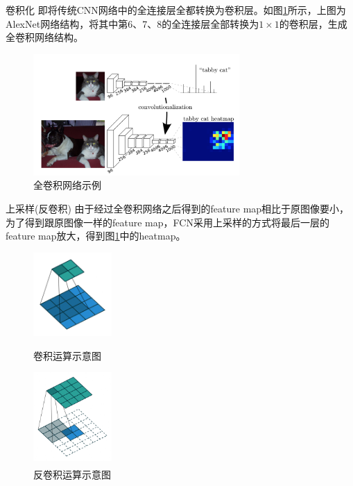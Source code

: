 \documentclass{beamer}
\newcommand{\upcite}[1]{\textsuperscript{\textsuperscript{\cite{#1}}}}
\begin{document}
\begin{frame}{卷积化}
\qquad 即将传统CNN网络中的全连接层全都转换为卷积层。如图\ref{fcn}所示，上图为AlexNet网络结构，将其中第6、7、8的全连接层全部转换为$1\times1$的卷积层，生成全卷积网络结构。
\begin{figure}
	\centering
	\includegraphics[width=0.7\textwidth]{images/fcn.png}
	\caption{\label{fcn}全卷积网络示例}
\end{figure}
\end{frame}
\begin{frame}{上采样(反卷积)}
由于经过全卷积网络之后得到的feature map相比于原图像要小，为了得到跟原图像一样的feature map，FCN采用上采样的方式将最后一层的feature map放大，得到图\ref{fcn}中的heatmap。

\begin{figure}
	\centering
	\begin{minipage}[t]{0.45\textwidth}
		\centering
		\includegraphics[width=3cm]{images/no_padding_no_strides-0.png}
		\caption{\label{conv}卷积运算示意图}
	\end{minipage}
	\begin{minipage}[t]{0.45\textwidth}
		\centering
		\includegraphics[width=3cm]{images/no_padding_no_strides_transposed-0.png}
		\caption{\label{deconv}反卷积运算示意图\upcite{dumoulin2016guide}}
	\end{minipage}
	
\end{figure}
\end{frame}
\end{document}
